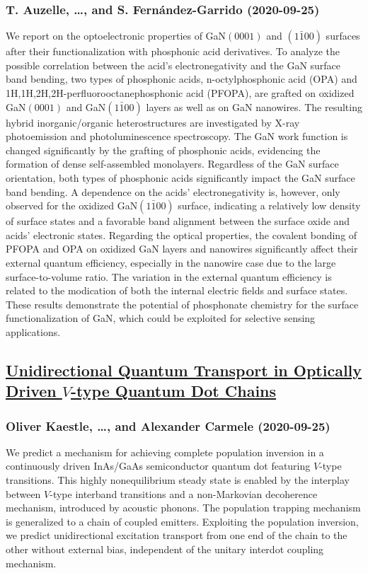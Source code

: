 \subsubsection*{T. Auzelle, \dots, and S. Fernández-Garrido (2020-09-25)}
We report on the optoelectronic properties of GaN$(0001)$ and $(1\bar{1}00)$
surfaces after their functionalization with phosphonic acid derivatives. To
analyze the possible correlation between the acid's electronegativity and the
GaN surface band bending, two types of phosphonic acids, n-octylphosphonic acid
(OPA) and 1H,1H,2H,2H-perfluorooctanephosphonic acid (PFOPA), are grafted on
oxidized GaN$(0001)$ and GaN$(1\bar{1}00)$ layers as well as on GaN nanowires.
The resulting hybrid inorganic/organic heterostructures are investigated by
X-ray photoemission and photoluminescence spectroscopy. The GaN work function
is changed significantly by the grafting of phosphonic acids, evidencing the
formation of dense self-assembled monolayers. Regardless of the GaN surface
orientation, both types of phosphonic acids significantly impact the GaN
surface band bending. A dependence on the acids' electronegativity is, however,
only observed for the oxidized GaN$(1\bar{1}00)$ surface, indicating a
relatively low density of surface states and a favorable band alignment between
the surface oxide and acids' electronic states. Regarding the optical
properties, the covalent bonding of PFOPA and OPA on oxidized GaN layers and
nanowires significantly affect their external quantum efficiency, especially in
the nanowire case due to the large surface-to-volume ratio. The variation in
the external quantum efficiency is related to the modication of both the
internal electric fields and surface states. These results demonstrate the
potential of phosphonate chemistry for the surface functionalization of GaN,
which could be exploited for selective sensing applications.

\subsection*{\href{http://arxiv.org/abs/2009.12083v2}{Unidirectional Quantum Transport in Optically Driven $V$-type Quantum  Dot Chains}}
\subsubsection*{Oliver Kaestle, \dots, and Alexander Carmele (2020-09-25)}
We predict a mechanism for achieving complete population inversion in a
continuously driven InAs/GaAs semiconductor quantum dot featuring $V$-type
transitions. This highly nonequilibrium steady state is enabled by the
interplay between $V$-type interband transitions and a non-Markovian
decoherence mechanism, introduced by acoustic phonons. The population trapping
mechanism is generalized to a chain of coupled emitters. Exploiting the
population inversion, we predict unidirectional excitation transport from one
end of the chain to the other without external bias, independent of the unitary
interdot coupling mechanism.

